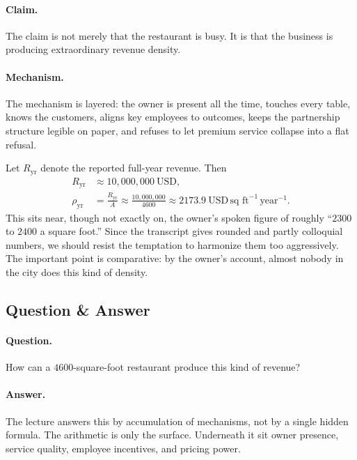 \paragraph{Claim.} The claim is not merely that the restaurant is busy. It is that the business is producing extraordinary revenue density.

\paragraph{Mechanism.} The mechanism is layered: the owner is present all the time, touches every table, knows the customers, aligns key employees to outcomes, keeps the partnership structure legible on paper, and refuses to let premium service collapse into a flat refusal.

Let \(R_{\mathrm{yr}}\) denote the reported full-year revenue. Then
\begin{align}
R_{\mathrm{yr}} &\approx 10{,}000{,}000\ \text{USD},\\
\rho_{\mathrm{yr}} &= \frac{R_{\mathrm{yr}}}{A}
\approx
\frac{10{,}000{,}000}{4600}
\approx
2173.9\ \text{USD}\,\text{sq ft}^{-1}\,\text{year}^{-1}.
\end{align}
This sits near, though not exactly on, the owner's spoken figure of roughly ``\(2300\) to \(2400\) a square foot.'' Since the transcript gives rounded and partly colloquial numbers, we should resist the temptation to harmonize them too aggressively. The important point is comparative: by the owner's account, almost nobody in the city does this kind of density.

\subsection{Question \& Answer}

\paragraph{Question.} How can a \(4600\)-square-foot restaurant produce this kind of revenue?

\paragraph{Answer.} The lecture answers this by accumulation of mechanisms, not by a single hidden formula. The arithmetic is only the surface. Underneath it sit owner presence, service quality, employee incentives, and pricing power.

